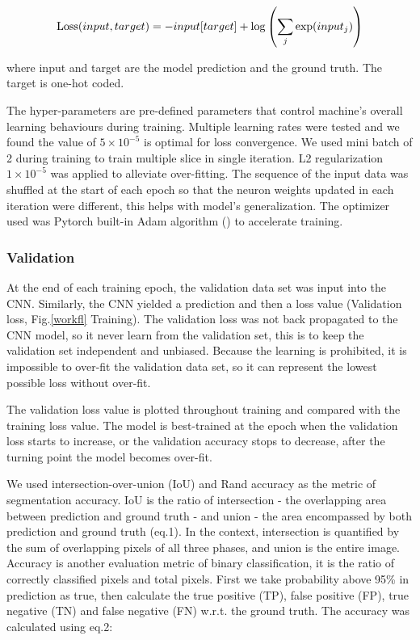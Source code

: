 \documentclass[draft,linenumbers]{agujournal2018}
\begin{document}
\begin{equation}\label{lossequation}
    \centering
    \text{Loss}(input, target) 
    = -input[target] + \log\left(\sum_j\exp(input_j)\right)
\end{equation}

where input and target are the model prediction and the ground truth. The target is one-hot coded.

The hyper-parameters are pre-defined parameters that control machine's overall learning behaviours during training. Multiple learning rates were tested and we found the value of $5\times10^{-5}$ is optimal for loss convergence. We used mini batch of 2 during training to train multiple slice in single iteration. L2 regularization $1\times10^{-5}$ was applied to alleviate over-fitting. The sequence of the input data was shuffled at the start of each epoch so that the neuron weights updated in each iteration were different, this helps with model's generalization. The optimizer used was Pytorch built-in Adam algorithm (\citet{kingma2014adam}) to accelerate training. 

\subsubsection{Validation}
At the end of each training epoch, the validation data set was input into the CNN. Similarly, the CNN yielded a prediction and then a loss value (Validation loss, Fig.\ref{workfl} Training). The validation loss was not back propagated to the CNN model, so it never learn from the validation set, this is to keep the validation set independent and unbiased. Because the learning is prohibited, it is impossible to over-fit the validation data set, so it can represent the lowest possible loss without over-fit.

The validation loss value is plotted throughout training and compared with the training loss value. The model is best-trained at the epoch when the validation loss starts to increase, or the validation accuracy stops to decrease, after the turning point the model becomes over-fit. 
 
We used intersection-over-union (IoU) and Rand accuracy as the metric of segmentation accuracy. IoU is the ratio of intersection - the overlapping area between prediction and ground truth - and union - the area encompassed by both prediction and ground truth (eq.1). In the context, intersection is quantified by the sum of overlapping pixels of all three phases, and union is the entire image. Accuracy is another evaluation metric of binary classification, it is the ratio of correctly classified pixels and total pixels. First we take probability above 95\% in prediction as true, then calculate the true positive (TP), false positive (FP), true negative (TN) and false negative (FN) w.r.t. the ground truth. The accuracy was calculated using eq.2:
\end{document}
